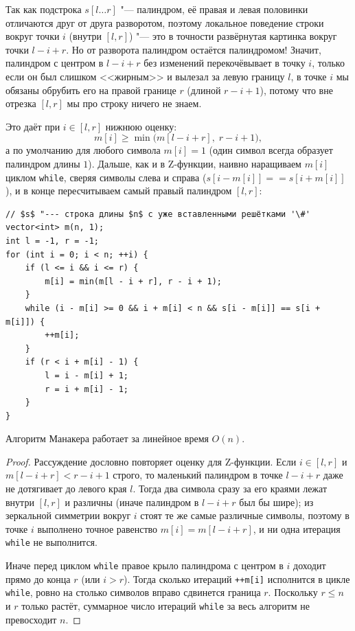 Так как подстрока $s[l \dots r]$ "--- палиндром, её правая и левая половинки отличаются друг от друга разворотом, поэтому локальное поведение строки вокруг точки $i$ (внутри $[l, r]$) "--- это в точности развёрнутая картинка вокруг точки $l - i + r$. Но от разворота палиндром остаётся палиндромом! Значит, палиндром с центром в $l - i + r$ без изменений перекочёвывает в точку $i$, только если он был слишком <<жирным>> и вылезал за левую границу $l$, в точке $i$ мы обязаны обрубить его на правой границе $r$ (длиной $r - i + 1$), потому что вне отрезка $[l, r]$ мы про строку ничего не знаем.

Это даёт при $i \in [l, r]$ нижнюю оценку:
\begin{equation}\label{eq:manacher_bound}
    m[i] \ge \min\bigl(m[l - i + r],\; r - i + 1\bigr),
\end{equation}
а по умолчанию для любого символа $m[i] = 1$ (один символ всегда образует палиндром длины $1$). Дальше, как и в Z-функции, наивно наращиваем $m[i]$ циклом \texttt{while}, сверяя символы слева и справа ($s[i - m[i]] == s[i + m[i]]$), и в конце пересчитываем самый правый палиндром $[l, r]$:

\begin{lstlisting}
// $s$ "--- строка длины $n$ с уже вставленными решётками '\#'
vector<int> m(n, 1);
int l = -1, r = -1;
for (int i = 0; i < n; ++i) {
    if (l <= i && i <= r) {
        m[i] = min(m[l - i + r], r - i + 1);
    }
    while (i - m[i] >= 0 && i + m[i] < n && s[i - m[i]] == s[i + m[i]]) {
        ++m[i];
    }
    if (r < i + m[i] - 1) {
        l = i - m[i] + 1;
        r = i + m[i] - 1;
    }
}
\end{lstlisting}

\begin{theorem}
    Алгоритм Манакера работает за линейное время $O(n)$.
\end{theorem}

\begin{proof}
    Рассуждение дословно повторяет оценку для Z-функции. Если $i \in [l, r]$ и $m[l - i + r] < r - i + 1$ строго, то маленький палиндром в точке $l - i + r$ даже не дотягивает до левого края $l$. Тогда два символа сразу за его краями лежат внутри $[l, r]$ и различны (иначе палиндром в $l - i + r$ был бы шире); из зеркальной симметрии вокруг $i$ стоят те же самые различные символы, поэтому в точке $i$ выполнено точное равенство $m[i] = m[l - i + r]$, и ни одна итерация \texttt{while} не выполнится.

    Иначе перед циклом \texttt{while} правое крыло палиндрома с центром в $i$ доходит прямо до конца $r$ (или $i > r$). Тогда сколько итераций \texttt{++m[i]} исполнится в цикле \texttt{while}, ровно на столько символов вправо сдвинется граница $r$. Поскольку $r \le n$ и $r$ только растёт, суммарное число итераций \texttt{while} за весь алгоритм не превосходит $n$.
\end{proof}
